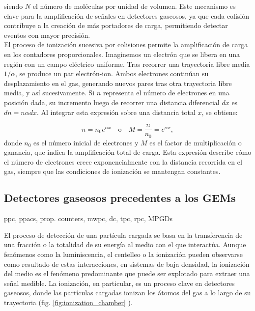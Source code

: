 \documentclass{article}
\begin{document}
\noindent siendo $N$ el número de moléculas por unidad de volumen. Este mecanismo es clave para la amplificación de señales en detectores gaseosos, ya que cada colisión contribuye a la creación de más portadores de carga, permitiendo detectar eventos con mayor precisión.\\

\noindent El proceso de ionización sucesiva por colisiones permite la amplificación de carga en los contadores proporcionales. Imaginemos un electrón que se libera en una región con un campo eléctrico uniforme. Tras recorrer una trayectoria libre media $1/\alpha$, se produce un par electrón-ion. Ambos electrones continúan su desplazamiento en el gas, generando nuevos pares tras otra trayectoria libre media, y así sucesivamente. Si $n$ representa el número de electrones en una posición dada, su incremento luego de recorrer una distancia diferencial $dx$ es $dn = n \alpha dx$. Al integrar esta expresión sobre una distancia total $x$, se obtiene:

\begin{equation}
n = n_0 e^{\alpha x} \quad \text{o} \quad M = \frac{n}{n_0} = e^{\alpha x},
\end{equation}
donde \(n_0\) es el número inicial de electrones y \(M\) es el factor de multiplicación o ganancia, que indica la amplificación total de carga. Esta expresión describe cómo el número de electrones crece exponencialmente con la distancia recorrida en el gas, siempre que las condiciones de ionización se mantengan constantes.


\subsection{Detectores gaseosos precedentes a los GEMs}
ppc, ppacs, prop. counters, mwpc, dc, tpc, rpc, MPGDs

\noindent El proceso de detección de una partícula cargada se basa en la transferencia de una fracción o la totalidad de su energía al medio con el que interactúa. Aunque fenómenos como la luminiscencia, el centelleo o la ionización pueden observarse como resultado de estas interacciones, en sistemas de baja densidad, la ionización del medio es el fenómeno predominante que puede ser explotado para extraer una señal medible. La ionización, en particular, es un proceso clave en detectores gaseosos, donde las partículas cargadas ionizan los átomos del gas a lo largo de su trayectoria (fig. \ref{fig:ionization_chamber} ).
\end{document}
